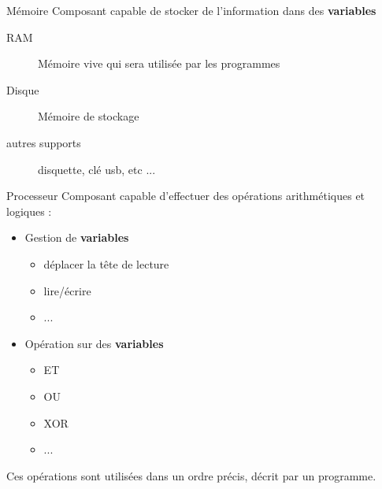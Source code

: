 \begin{frame}{Mémoire}
    Composant capable de stocker de l'information dans des \textbf{variables}
    \begin{description}
        \item[RAM] Mémoire vive qui sera utilisée par les programmes
        \item[Disque] Mémoire de stockage
        \item[autres supports] disquette, clé usb, etc ...
    \end{description}
\end{frame}

\begin{frame}{Processeur}
    Composant capable d'effectuer des opérations arithmétiques et logiques :
    \begin{itemize}
        \item Gestion de \textbf{variables}
        \begin{itemize}
            \item déplacer la tête de lecture
            \item lire/écrire
            \item ...
        \end{itemize}
        \item Opération sur des \textbf{variables}
        \begin{itemize}
            \item ET
            \item OU
            \item XOR
            \item ...
        \end{itemize}
    \end{itemize}
    Ces opérations sont utilisées dans un ordre précis, décrit par un programme.
\end{frame}

